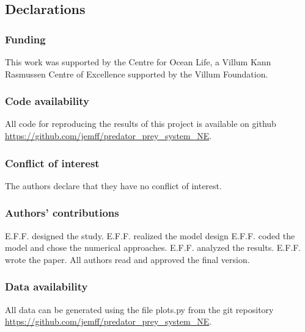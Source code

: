 \documentclass[referee,natbib,smallcondensed]{svjour3}     %
\begin{document}
\subsection*{Declarations}

\subsubsection*{Funding}
This work was supported by the Centre for Ocean Life,
a Villum Kann Rasmussen Centre of Excellence supported
by the Villum Foundation.
\subsubsection*{Code availability}
All code for reproducing the results of this project is available on github \url{https://github.com/jemff/predator_prey_system_NE}.
\subsubsection*{Conflict of interest}
The authors declare that they have no conflict of interest.
\subsubsection*{Authors' contributions}
E.F.F. designed the study. E.F.F. realized the model design E.F.F. coded the model and chose the numerical approaches. E.F.F. analyzed the results. E.F.F. wrote the paper. All authors read and approved the final version.
\subsubsection*{Data availability}
All data can be generated using the file plots.py from the git repository \url{https://github.com/jemff/predator_prey_system_NE}.

\appendix

%
%
%
\end{document}
